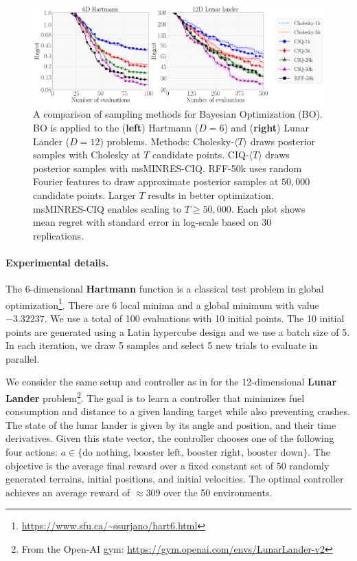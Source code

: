 \begin{figure}[t!]
  \centering
  \includegraphics[width=\linewidth]{figures/bo_ciq.pdf}
  \caption[
    Comparison of msMINRES-CIQ versus other sampling methods for Bayesian optimization via Thompson Sampling.
  ]{
    A comparison of sampling methods for Bayesian Optimization (BO).
    BO is applied to the ({\bf left}) Hartmann ($D=6$) and ({\bf right}) Lunar Lander ($D=12$) problems.
    Methods: Cholesky-$\langle T \rangle$ draws posterior samples with Cholesky at $T$ candidate points.
    CIQ-$\langle T \rangle$ draws posterior samples with msMINRES-CIQ.
    RFF-50k uses random Fourier features to draw approximate posterior samples at $50,\!000$ candidate points.
    Larger $T$ results in better optimization.
    msMINRES-CIQ enables scaling to $T \geq 50,\!000$.
    Each plot shows mean regret with standard error in log-scale based on 30 replications.
  }
  \label{fig:bayesopt}
\end{figure}

\paragraph{Experimental details.}
The 6-dimensional {\bf Hartmann} function is a classical test problem in global optimization\footnote{\url{https://www.sfu.ca/~ssurjano/hart6.html}}.
There are 6 local minima and a global minimum with value $-3.32237$.
We use a total of 100 evaluations with 10 initial points.
The 10 initial points are generated using a Latin hypercube design and we use a batch size of 5.
In each iteration, we draw 5 samples and select 5 new trials to evaluate in parallel.

We consider the same setup and controller as in \cite{eriksson2019scalable} for the 12-dimensional {\bf Lunar Lander} problem\footnote{
 From the Open-AI gym: \url{https://gym.openai.com/envs/LunarLander-v2}
}.
The goal is to learn a controller that minimizes fuel consumption and distance to a given landing target while also preventing crashes.
The state of the lunar lander is given by its angle and position, and their time derivatives.
Given this state vector, the controller chooses one of the following four actions: $a \in \{\text{do nothing, booster left, booster right, booster down}\}$.
The objective is the average final reward over a fixed constant set of $50$ randomly generated terrains, initial positions, and initial velocities.
The optimal controller achieves an average reward of $\approx 309$ over the 50 environments.

